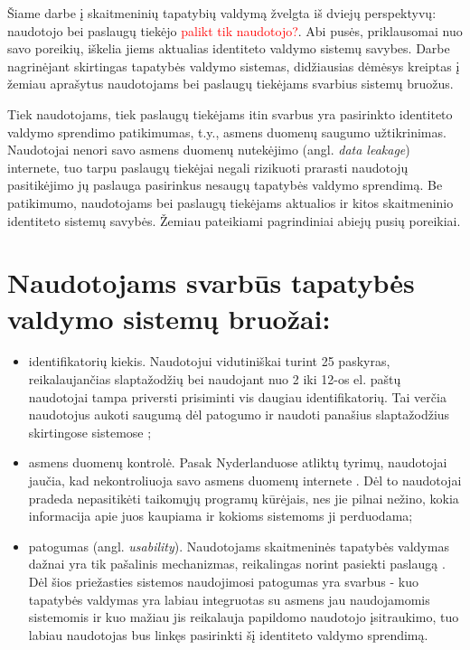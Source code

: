 Šiame darbe į skaitmeninių tapatybių valdymą žvelgta iš dviejų perspektyvų: naudotojo bei paslaugų tiekėjo \textcolor{red}{palikt tik naudotojo?}. Abi pusės,
priklausomai nuo savo poreikių, iškelia jiems aktualias identiteto valdymo sistemų savybes. Darbe nagrinėjant skirtingas tapatybės valdymo sistemas,
didžiausias dėmėsys kreiptas į žemiau aprašytus naudotojams bei paslaugų tiekėjams svarbius sistemų bruožus.

Tiek naudotojams, tiek paslaugų tiekėjams itin svarbus yra pasirinkto identiteto valdymo sprendimo patikimumas, t.y., asmens duomenų saugumo užtikrinimas.
Naudotojai nenori savo asmens duomenų nutekėjimo (angl. \textit{data leakage}) internete, tuo tarpu paslaugų tiekėjai negali rizikuoti prarasti naudotojų pasitikėjimo
jų paslauga pasirinkus nesaugų tapatybės valdymo sprendimą. Be patikimumo, naudotojams bei paslaugų tiekėjams aktualios ir 
kitos skaitmeninio identiteto sistemų savybės. Žemiau pateikiami pagrindiniai abiejų pusių poreikiai.
\\

\chapter{\textbf{Naudotojams svarbūs tapatybės valdymo sistemų bruožai:}}

\begin{itemize}
    \item identifikatorių kiekis. Naudotojui vidutiniškai turint 25 paskyras, reikalaujančias slaptažodžių \cite{Florencio2007} bei naudojant
    nuo 2 iki 12-os el. paštų \cite{Gross2007} naudotojai tampa priversti prisiminti vis daugiau identifikatorių. Tai verčia naudotojus aukoti saugumą dėl patogumo ir naudoti panašius
    slaptažodžius skirtingose sistemose \cite{Pashalidis2003, Samar1999};
    \item asmens duomenų kontrolė. Pasak Nyderlanduose atliktų tyrimų, naudotojai jaučia, kad nekontroliuoja savo asmens duomenų internete \cite{Baars2016}. Dėl to
    naudotojai pradeda nepasitikėti taikomųjų programų kūrėjais, nes jie pilnai nežino, kokia informacija apie juos kaupiama ir kokioms
    sistemoms ji perduodama;
    \item patogumas (angl. \textit{usability}). Naudotojams skaitmeninės tapatybės valdymas dažnai yra tik pašalinis mechanizmas, reikalingas
    norint pasiekti paslaugą \cite{Dhamija2008}. Dėl šios priežasties sistemos naudojimosi patogumas yra svarbus - kuo tapatybės valdymas yra labiau integruotas
    su asmens jau naudojamomis sistemomis ir kuo mažiau jis reikalauja papildomo naudotojo įsitraukimo, tuo labiau naudotojas bus linkęs pasirinkti šį identiteto valdymo sprendimą.
\end{itemize}

